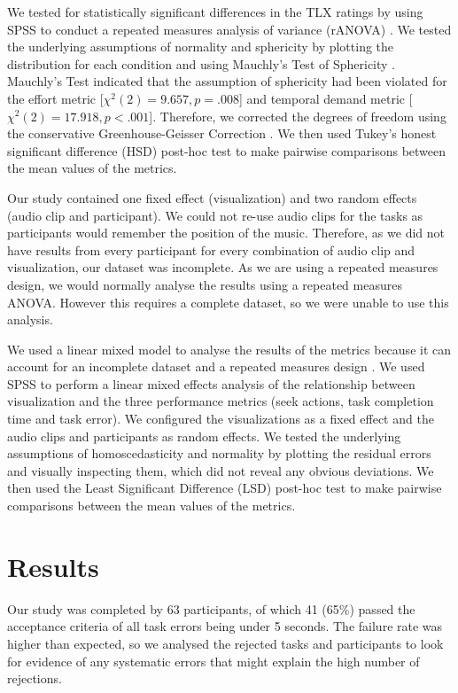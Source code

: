 We tested for statistically significant differences in the TLX ratings by using SPSS to conduct a repeated measures
analysis of variance (rANOVA) \citep[p.~409]{Shalabh2009}.  We tested the underlying assumptions of normality and
sphericity by plotting the distribution for each condition and using Mauchly's Test of Sphericity
\citep[p.~415]{Shalabh2009}.  Mauchly's Test indicated that the assumption of sphericity had been violated for the
effort metric [$\chi^2(2) = 9.657, p=.008$] and temporal demand metric [$\chi^2(2) = 17.918, p<.001$]. Therefore, we
corrected the degrees of freedom using the conservative Greenhouse-Geisser Correction \citep[p.~416]{Shalabh2009}.  We
then used Tukey's honest significant difference (HSD) post-hoc test \citep[p.~139]{Shalabh2009} to make pairwise
comparisons between the mean values of the metrics.

Our study contained one fixed effect (visualization) and two random effects (audio clip and participant).  We could not
re-use audio clips for the tasks as participants would remember the position of the music.  Therefore, as we did not
have results from every participant for every combination of audio clip and visualization, our dataset was incomplete.
As we are using a repeated measures design, we would normally analyse the results using a repeated measures ANOVA.
However this requires a complete dataset, so we were unable to use this analysis.

We used a linear mixed model to analyse the results of the metrics because it can account for an incomplete dataset and
a repeated measures design \citep{Gueorguieva2004}.  We used SPSS to perform a linear mixed effects analysis
\citep[p.~274]{Shalabh2009} of the relationship between visualization and the three performance metrics (seek actions,
task completion time and task error).  We configured the visualizations as a fixed effect and the audio clips and
participants as random effects. We tested the underlying assumptions of homoscedasticity and normality by plotting the
residual errors and visually inspecting them, which did not reveal any obvious deviations.
We then used the Least Significant Difference (LSD) post-hoc test \citep[p.~137]{Shalabh2009} to make pairwise
comparisons between the mean values of the metrics.







\clearpage
\section{Results}\label{sec:vis-results}
Our study was completed by 63 participants, of which 41 (65\%) passed the acceptance criteria of all task errors being
under 5 seconds. The failure rate was higher than expected, so we analysed the rejected tasks and participants to look
for evidence of any systematic errors that might explain the high number of rejections.


